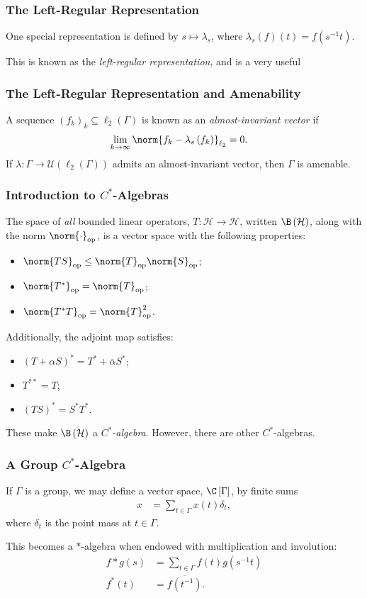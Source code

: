 \documentclass{beamer-custom}
\DeclareMathOperator{\op}{op}
\begin{document}
\begin{frame}
  \frametitle{The Left-Regular Representation}
  One special representation is defined by $s\mapsto \lambda_s$, where $\lambda_s(f)(t) = f\left( s^{-1}t \right)$.\newline

  This is known as the \textit{left-regular representation}, and is a very useful 
\end{frame}
\begin{frame}
  \frametitle{The Left-Regular Representation and Amenability}
  A sequence $\left( f_k \right)_k\subseteq \ell_2\left( \Gamma \right)$ is known as an \textit{almost-invariant vector} if
  \begin{align*}
    \lim_{k\rightarrow\infty}\norm{f_k - \lambda_s\left( f_k \right)}_{\ell_2} &= 0.
  \end{align*}\pause
  If $\lambda\colon \Gamma\rightarrow \mathcal{U}\left( \ell_2\left( \Gamma \right) \right)$ admits an almost-invariant vector, then $\Gamma$ is amenable.
\end{frame}
\begin{frame}
  \frametitle{Introduction to $C^{\ast}$-Algebras}
  \small
  The space of \textit{all} bounded linear operators, $T\colon \mathcal{H}\rightarrow \mathcal{H}$, written $\B\left( \mathcal{H} \right)$, along with the norm $\norm{\cdot}_{\op}$, is a vector space with the following properties:
  \begin{itemize}
    \item $\norm{TS}_{\op}\leq \norm{T}_{\op}\norm{S}_{\op}$;
    \item $\norm{T^{\ast}}_{\op}= \norm{T}_{\op}$;
    \item $\norm{T^{\ast}T}_{\op} = \norm{T}^2_{\op}$.
  \end{itemize}
  Additionally, the adjoint map satisfies:
  \begin{itemize}
    \item $\left( T + \alpha S \right)^{\ast} = T^{\ast} + \overline{\alpha} S^{\ast}$;
    \item $T^{\ast\ast} = T$;
    \item $\left( TS \right)^{\ast} = S^{\ast}T^{\ast}$.
  \end{itemize}
  These make $\B\left( \mathcal{H} \right)$ a \textit{$C^{\ast}$-algebra}. However, there are other $C^{\ast}$-algebras.
\end{frame}
\begin{frame}
  \frametitle{A Group $C^{\ast}$-Algebra}
  If $\Gamma$ is a group, we may define a vector space, $\C\left[ \Gamma \right]$, by finite sums
  \begin{align*}
    x &= \sum_{t\in\Gamma}x(t)\delta_t,
  \end{align*}
  where $\delta_t$ is the point mass at $t\in \Gamma$.\pause\newline

  This becomes a $\ast$-algebra when endowed with multiplication and involution:
  \begin{align*}
    f\ast g(s) &= \sum_{t\in\Gamma}f(t)g\left( s^{-1}t \right)\\
    f^{\ast}(t) &= \overline{f\left( t^{-1} \right)}.
  \end{align*}
\end{frame}
\end{document}
